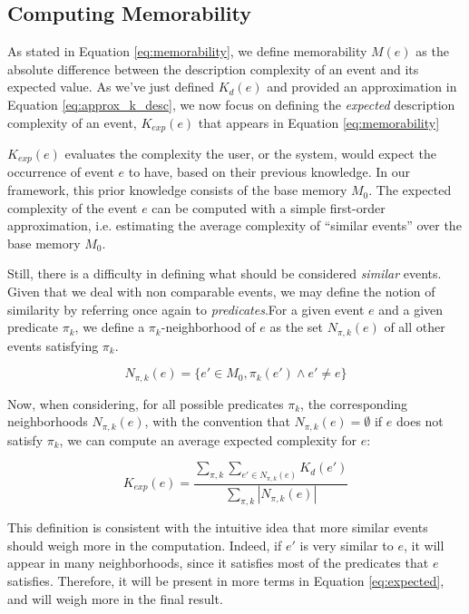 \documentclass[conference]{IEEEtran}
\begin{document}
\subsection{Computing Memorability}
As stated in Equation \ref{eq:memorability}, we define memorability $M(e)$ as the absolute difference between the description complexity of an event and its expected value. As we've just defined $K_d(e)$ and provided an approximation in Equation \ref{eq:approx_k_desc}, we now focus on defining the \emph{expected} description complexity of an event, $K_{exp}(e)$ that appears in Equation \ref{eq:memorability}

$K_{exp}(e)$ evaluates the complexity the user, or the system, would expect the occurrence of event $e$ to have, based on their previous knowledge. In our framework, this prior knowledge consists of the base memory $M_0$. The expected complexity of the event $e$ can be computed with a simple first-order approximation, i.e. estimating the average complexity of ``similar events'' over the base memory $M_0$.

Still, there is a difficulty in defining what
should be considered \emph{similar} events. Given that we deal with non comparable events, we may define the notion of similarity by referring once again to \emph{predicates}.For a given event $e$ and a given predicate $\pi_k$, we define a $\pi_k$-neighborhood of $e$ as the set $N_{\pi, k}(e)$ of all other events satisfying $\pi_k$.

\begin{equation}
\label{eq:similar}
N_{\pi, k}(e) = \{e'\in M_0, \pi_k(e') \wedge e' \neq e\}
\end{equation}

Now, when considering, for all possible predicates $\pi_k$, the corresponding
neighborhoods $N_{\pi, k}(e)$, with the convention that $N_{\pi, k}(e) = \emptyset$
if $e$ does not satisfy $\pi_k$, we can compute an average expected complexity for $e$:

\begin{equation}
\label{eq:expected}
K_{exp}(e) = \frac{
\sum_{\pi, k} \sum_{e' \in N_{\pi, k}(e)} K_d(e')
}{
\sum_{\pi, k} |N_{\pi, k}(e)|
}
\end{equation}

This definition is consistent with the intuitive idea that more similar events should weigh more in the computation. Indeed, if $e'$
is very similar to $e$, it will appear in many neighborhoods, since it
satisfies most of the predicates that $e$ satisfies. Therefore, it will
be present in more terms in Equation \ref{eq:expected}, and will weigh more in
the final result.
\end{document}

